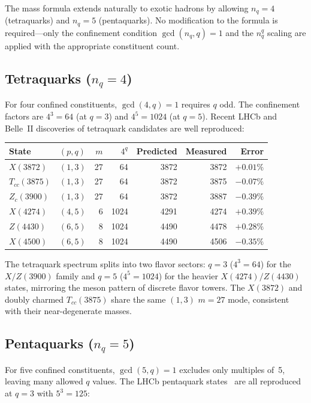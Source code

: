 \documentclass[11pt,a4paper]{article}
\begin{document}
The mass formula extends naturally to exotic hadrons by allowing
$n_q = 4$ (tetraquarks) and $n_q = 5$ (pentaquarks).  No
modification to the formula is required---only the confinement
condition $\gcd(n_q, q) = 1$ and the $n_q^q$ scaling are applied
with the appropriate constituent count.

\subsection{Tetraquarks ($n_q = 4$)}

For four confined constituents, $\gcd(4, q) = 1$ requires $q$ odd.
The confinement factors are $4^3 = 64$ (at $q = 3$) and
$4^5 = 1024$ (at $q = 5$).  Recent LHCb and Belle~II discoveries
of tetraquark candidates are well reproduced:

\begin{center}
\begin{tabular}{llrrrrr}
\toprule
State & $(p,q)$ & $m$ & $4^q$ & Predicted & Measured & Error \\
\midrule
$X(3872)$    & $(1,3)$ & 27 &  64 & 3872 & 3872 & $+0.01\%$ \\
$T_{cc}(3875)$ & $(1,3)$ & 27 & 64 & 3872 & 3875 & $-0.07\%$ \\
$Z_c(3900)$  & $(1,3)$ & 27 &  64 & 3872 & 3887 & $-0.39\%$ \\
$X(4274)$    & $(4,5)$ &  6 & 1024 & 4291 & 4274 & $+0.39\%$ \\
$Z(4430)$    & $(6,5)$ &  8 & 1024 & 4490 & 4478 & $+0.28\%$ \\
$X(4500)$    & $(6,5)$ &  8 & 1024 & 4490 & 4506 & $-0.35\%$ \\
\bottomrule
\end{tabular}
\end{center}

The tetraquark spectrum splits into two flavor sectors: $q = 3$
($4^3 = 64$) for the $X/Z(3900)$ family and $q = 5$ ($4^5 = 1024$)
for the heavier $X(4274)/Z(4430)$ states, mirroring the meson
pattern of discrete flavor towers.  The $X(3872)$ and doubly charmed
$T_{cc}(3875)$ share the same $(1,3)$ $m = 27$ mode, consistent
with their near-degenerate masses.

\subsection{Pentaquarks ($n_q = 5$)}

For five confined constituents, $\gcd(5, q) = 1$ excludes only
multiples of~5, leaving many allowed $q$ values.  The LHCb
pentaquark states~\cite{PDG} are all reproduced at $q = 3$ with
$5^3 = 125$:
\end{document}
